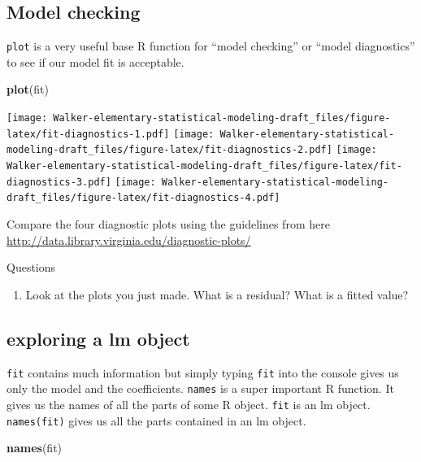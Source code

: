 \documentclass[]{book}
\newenvironment{Shaded}{\begin{snugshade}}{\end{snugshade}}
\newcommand{\KeywordTok}[1]{\textcolor[rgb]{0.13,0.29,0.53}{\textbf{#1}}}
\newcommand{\NormalTok}[1]{#1}
\providecommand{\tightlist}{%
  \setlength{\itemsep}{0pt}\setlength{\parskip}{0pt}}
\begin{document}
\subsection{Model checking}

\texttt{plot} is a very useful base R function for ``model checking'' or
``model diagnostics'' to see if our model fit is acceptable.

\begin{Shaded}
\begin{Highlighting}[]
\KeywordTok{plot}\NormalTok{(fit)}
\end{Highlighting}
\end{Shaded}

\texttt{[image: Walker-elementary-statistical-modeling-draft\_files/figure-latex/fit-diagnostics-1.pdf]}
\texttt{[image: Walker-elementary-statistical-modeling-draft\_files/figure-latex/fit-diagnostics-2.pdf]}
\texttt{[image: Walker-elementary-statistical-modeling-draft\_files/figure-latex/fit-diagnostics-3.pdf]}
\texttt{[image: Walker-elementary-statistical-modeling-draft\_files/figure-latex/fit-diagnostics-4.pdf]}

Compare the four diagnostic plots using the guidelines from here
\url{http://data.library.virginia.edu/diagnostic-plots/}

Questions

\begin{enumerate}
\def\labelenumi{\arabic{enumi}.}
\setcounter{enumi}{5}
\tightlist
\item
  Look at the plots you just made. What is a residual? What is a fitted
  value?
\end{enumerate}

\subsection{exploring a lm object}\label{exploring-a-lm-object}

\texttt{fit} contains much information but simply typing \texttt{fit}
into the console gives us only the model and the coefficients.
\texttt{names} is a super important R function. It gives us the names of
all the parts of some R object. \texttt{fit} is an lm object.
\texttt{names(fit)} gives us all the parts contained in an lm object.

\begin{Shaded}
\begin{Highlighting}[]
\KeywordTok{names}\NormalTok{(fit)}
\end{Highlighting}
\end{Shaded}
\end{document}
